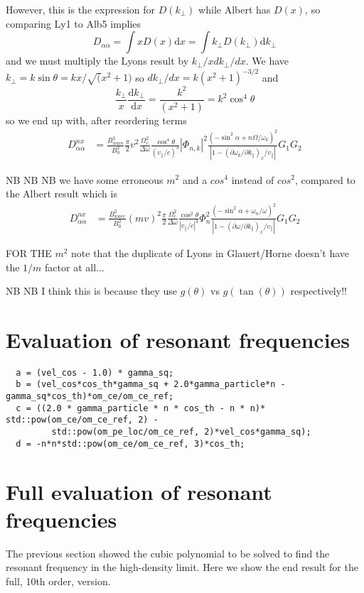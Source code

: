 \documentclass[]{article}
\begin{document}
However, this is the expression for $D(k_\perp)$ while Albert has $D(x)$, so comparing Ly1 to Alb5 implies
\begin{equation}
D_{\alpha\alpha} = \int x D(x) \mathrm{d}x = \int k_\perp D(k_\perp) \mathrm{d} k_\perp
\end{equation}
and we must multiply the Lyons result by $k_\perp/x dk_\perp/dx$. 
We have $k_\perp = k \sin \theta = k x /\sqrt(x^2 +1)$ so $dk_\perp/dx = k (x^2+1)^{-3/2}$ and
\[ \frac{k_\perp}{x}\frac{\mathrm{d} k_\perp}{\mathrm{d} x} = \frac{k^2}{(x^2+1)}  = k^2 \cos^4\theta\]
so we end up with, after reordering terms
\begin{align}\label{LyEnd}
D_{\alpha\alpha}^{nx} &= \frac{B^2_{wave}}{B_0^2} \frac{\pi}{2} v^2 \frac{ \Omega_c^2 }{\Delta \omega}\frac{\cos^4\theta}{(v_\parallel/c)^3} |\Phi_{n,k}|^2 \frac{ (-\sin^2\alpha + n \Omega/\omega_k)^2}{ |1-(\partial \omega_k/\partial k_\parallel)_x/v_\parallel|} G_1 G_2
\end{align}

NB NB NB we have some erroneous $m^2$ and a $cos^4$ instead of $cos^2$, compared to the Albert result which is
\begin{align}
D_{\alpha\alpha}^{nx} &= \frac{B_{wave}^2}{B_0^2}(mv)^2 \frac{\pi}{2}\frac{\Omega_c^2}{\Delta\omega}\frac{\cos^2\theta}{|v_\parallel/c|^3}  \Phi_n^2 \frac{(-\sin^2\alpha + \omega_n/\omega)^2}{|1-(\partial \omega/\partial k_\parallel)_x/v_\parallel|} G_1 G_2 \end{align}

FOR THE $m^2$ note that the duplicate of Lyons in Glauert/Horne doesn't have the $1/m$ factor at all...

NB NB I think this is because they use $g(\theta)$ vs $g(\tan(\theta))$ respectively!!

\section{Evaluation of resonant frequencies}

\begin{verbatim}
  a = (vel_cos - 1.0) * gamma_sq;
  b = (vel_cos*cos_th*gamma_sq + 2.0*gamma_particle*n - gamma_sq*cos_th)*om_ce/om_ce_ref;
  c = ((2.0 * gamma_particle * n * cos_th - n * n)* std::pow(om_ce/om_ce_ref, 2) - 
         std::pow(om_pe_loc/om_ce_ref, 2)*vel_cos*gamma_sq);
  d = -n*n*std::pow(om_ce/om_ce_ref, 3)*cos_th;
\end{verbatim}

\section{Full evaluation of resonant frequencies}
The previous section showed the cubic polynomial to be solved to find the resonant frequency in the high-density limit. Here we show the end result for the full, 10th order, version.
\end{document}
